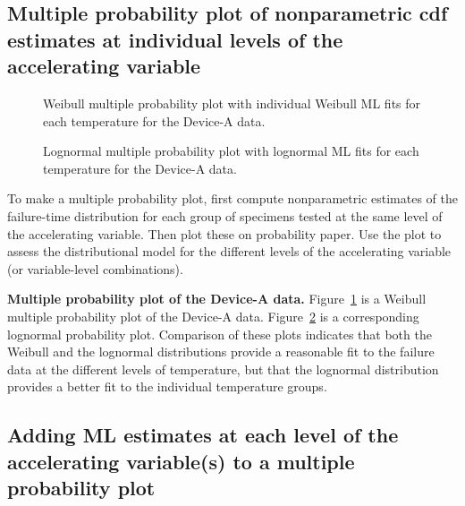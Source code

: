 \subsection{Multiple probability plot of
nonparametric cdf estimates at individual levels of the accelerating
variable}
\begin{figure}
\caption{Weibull multiple probability plot with individual Weibull ML fits
for each temperature for the Device-A data.}
\label{figure:devalt.weib.groupi.ps}
\end{figure}
\begin{figure}
\caption{Lognormal multiple probability plot 
with lognormal ML fits
for each temperature for the Device-A data.}
\label{figure:devalt.lnor.groupi.ps}
\end{figure}
To make a multiple probability plot, first compute nonparametric
estimates of the failure-time distribution for each group of
specimens tested at the same level of the accelerating
variable. Then plot these on probability paper. Use the plot to
assess the distributional model for the different levels of the
accelerating variable (or variable-level combinations).

\begin{example}{\bf Multiple probability plot of the Device-A data.}
Figure~\ref{figure:devalt.weib.groupi.ps} is a Weibull multiple
probability plot of the Device-A data.
Figure~\ref{figure:devalt.lnor.groupi.ps} is a corresponding
lognormal probability plot.  Comparison of these plots indicates
that both the Weibull and the lognormal distributions provide a
reasonable fit to the failure data at the different levels of
temperature, but that the lognormal distribution provides a better
fit to the individual temperature groups.
\end{example}
\subsection{Adding ML estimates at each level of 
the accelerating variable(s) to a multiple probability plot} 

